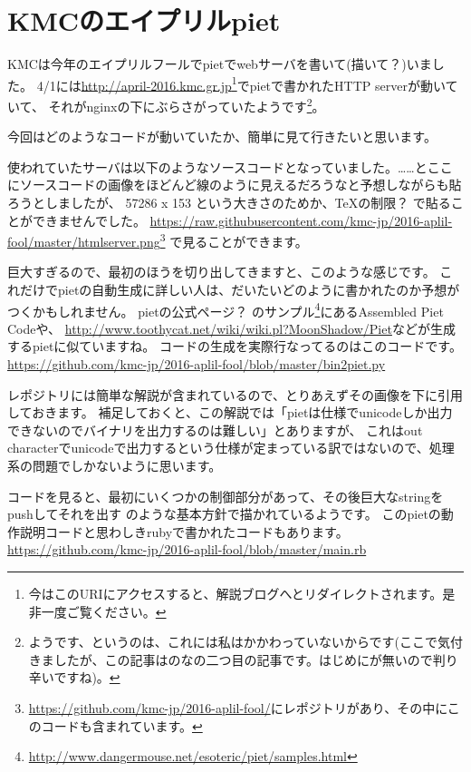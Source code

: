 \chapter[KMCのエイプリルpiet]{KMCのエイプリルpiet}

KMCは今年のエイプリルフールでpietでwebサーバを書いて(描いて？)いました。
4/1には\url{http://april-2016.kmc.gr.jp}\footnote{今はこのURIにアクセスすると、解説ブログへとリダイレクトされます。是非一度ご覧ください。}でpietで書かれたHTTP serverが動いていて、
それがnginxの下にぶらさがっていたようです\footnote{ようです、というのは、これには私はかかわっていないからです(ここで気付きましたが、この記事はのなの二つ目の記事です。はじめにが無いので判り辛いですね)。}。

今回はどのようなコードが動いていたか、簡単に見て行きたいと思います。

使われていたサーバは以下のようなソースコードとなっていました。……とここにソースコードの画像をほどんど線のように見えるだろうなと予想しながらも貼ろうとしましたが、
57286 x 153 という大きさのためか、\TeX の制限？ で貼ることができませんでした。
\url{https://raw.githubusercontent.com/kmc-jp/2016-aplil-fool/master/htmlserver.png}\footnote{\url{https://github.com/kmc-jp/2016-aplil-fool/}にレポジトリがあり、その中にこのコードも含まれています。}
で見ることができます。

巨大すぎるので、最初のほうを切り出してきますと、このような感じです。
これだけでpietの自動生成に詳しい人は、だいたいどのように書かれたのか予想がつくかもしれません。
pietの公式ページ？ のサンプル\footnote{\url{http://www.dangermouse.net/esoteric/piet/samples.html}}にあるAssembled Piet Codeや、
\url{http://www.toothycat.net/wiki/wiki.pl?MoonShadow/Piet}などが生成するpietに似ていますね。
コードの生成を実際行なってるのはこのコードです。
\url{https://github.com/kmc-jp/2016-aplil-fool/blob/master/bin2piet.py}

レポジトリには簡単な解説が含まれているので、とりあえずその画像を下に引用しておきます。
補足しておくと、この解説では「pietは仕様でunicodeしか出力できないのでバイナリを出力するのは難しい」とありますが、
これはout characterでunicodeで出力するという仕様が定まっている訳ではないので、処理系の問題でしかないように思います。

コードを見ると、最初にいくつかの制御部分があって、その後巨大なstringをpushしてそれを出す のような基本方針で描かれているようです。
このpietの動作説明コードと思わしきrubyで書かれたコードもあります。\url{https://github.com/kmc-jp/2016-aplil-fool/blob/master/main.rb}

